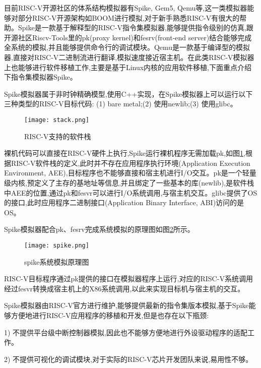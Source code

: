 目前RISC-V开源社区的体系结构模拟器有Spike, Gem5, Qemu\cite{bellard2005qemu}等,这一类模拟器能够对部分RISC-V开源架构如BOOM\cite{celio2016berkeley}进行模拟,对于新手熟悉RISC-V有很大的帮助。Spike是一款基于解释型的RISC-V指令集模拟器,能够提供指令级别的仿真,跟开源社区Riscv-Tools里的pk(proxy kernel)和fesrv(front-end server)结合能够完成全系统的模拟,并且能够提供命令行的调试模块。Qemu是一款基于编译型的模拟器\cite{varga2010omnet++},直接对RISC-V二进制流进行翻译,模拟速度接近宿主机。在此类RISC-V模拟器上也能够进行软件移植工作,主要是基于Linux内核的应用软件移植,下面重点介绍下指令集模拟器Spike。


Spike模拟器属于非时钟精确模型,使用C++实现，在Spike模拟器上可以运行以下三种类型的RISC-V目标代码: (1) bare metal;(2) 使用newlib;(3) 使用glibc。

\begin{figure}[H]
  \centering
  \texttt{[image: stack.png]}
  \caption{RISC-V支持的软件栈}
  \label{fig:stack}
\end{figure}

裸机代码可以直接在RISC-V硬件上执行,Spike运行裸机程序无需加载pk,如图\ref{fig:stack},根据RISC-V软件栈的定义,此时并不存在应用程序执行环境(Application Execution Environment, AEE),目标程序也不能够直接和宿主机进行I/O交互。pk是一个轻量级内核,预定义了主存的基地址等信息,并且绑定了一些基本的库(newlib),是软件栈中AEE的位置,通过pk和fesvr可以进行I/O系统调用,与宿主机交互。glibc提供了OS的接口,此时应用程序二进制接口(Application Binary Interface, ABI)访问的是OS。



Spike模拟器配合pk、fesrv完成系统模拟的原理图如图\ref{fig:spike}所示。
\begin{figure}[H]
  \centering
  \texttt{[image: spike.png]}
  \caption{spike系统模拟原理图}
  \label{fig:spike}
\end{figure}


RISC-V目标程序通过pk提供的接口在模拟器程序上运行,对应的RISC-V系统调用经过fesvr转换成宿主机上的X86系统调用,以此来实现目标机与宿主机的交互。


Spike模拟器由RISC-V官方进行维护,能够提供最新的指令集版本模拟,基于Spike能够方便地进行RISC-V应用程序的移植和开发,但是也存在以下瓶颈:

1) 不提供平台级中断控制器模拟,因此也不能够方便地进行外设驱动程序的适配工作。

2) 不提供可视化的调试模块,对于实际的RISC-V芯片开发团队来说,易用性不够。



